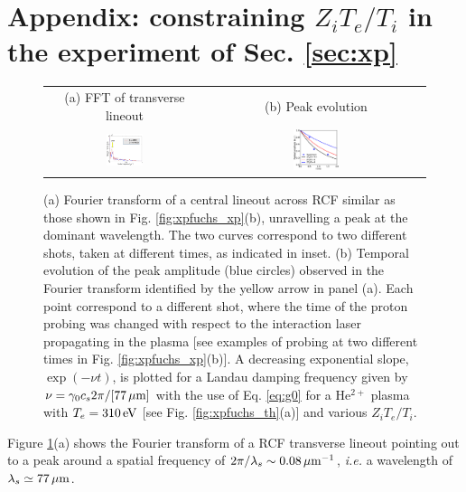 \documentclass[
 reprint,
 superscriptaddress,
 amsmath,amssymb,
 aps,
]{revtex4-1}
\def\tc{\textcolor{red}}
\begin{document}
\section*{Appendix: constraining $Z_iT_e/T_i$ in the experiment of Sec. \ref{sec:xp}}
\label{sec:ztesti}
\begin{figure}
\begin{tabular}{cc}
(a) FFT of transverse lineout&
(b) Peak evolution\\
\includegraphics[width=0.24\textwidth]{fucshsfft.png}& 
\includegraphics[width=0.22\textwidth]{fuchsztesti_new.eps}
\end{tabular}
\caption{ \label{fig:xpfuchs_ap}  
(a) Fourier transform of a central lineout across RCF similar as those shown in Fig. \ref{fig:xpfuchs_xp}(b), unravelling a peak at the dominant wavelength. The two curves correspond to two different shots, taken at different times, as indicated in inset.
(b) Temporal evolution of the peak amplitude (blue circles) observed in the Fourier transform identified by the yellow arrow in panel (a). Each point correspond to a different shot, where the time of the proton probing was changed with respect to the interaction laser propagating in the plasma [see examples of probing at two different times in  Fig. \ref{fig:xpfuchs_xp}(b)]. A decreasing exponential slope,  $\exp(-\nu t)$, is plotted for a Landau damping frequency given by $\nu=\gamma_0c_s2\pi/[77\,\rm\mu m]$ with the use of  Eq. \eqref{eq:g0} for a He$^{2+}$ plasma with \tc{$T_e=310\,\rm eV$} [see Fig. \ref{fig:xpfuchs_th}(a)] and various $Z_iT_e/T_i$.
}
\end{figure}
Figure \ref{fig:xpfuchs_ap}(a) shows the Fourier transform of a RCF transverse lineout pointing out to a peak around a spatial frequency of  $2\pi/\lambda_s\sim 0.08\, \rm \mu m^{-1}$, \emph{i.e.} a wavelength of $\lambda_s \simeq 77\, \rm \mu m$.
\end{document}
